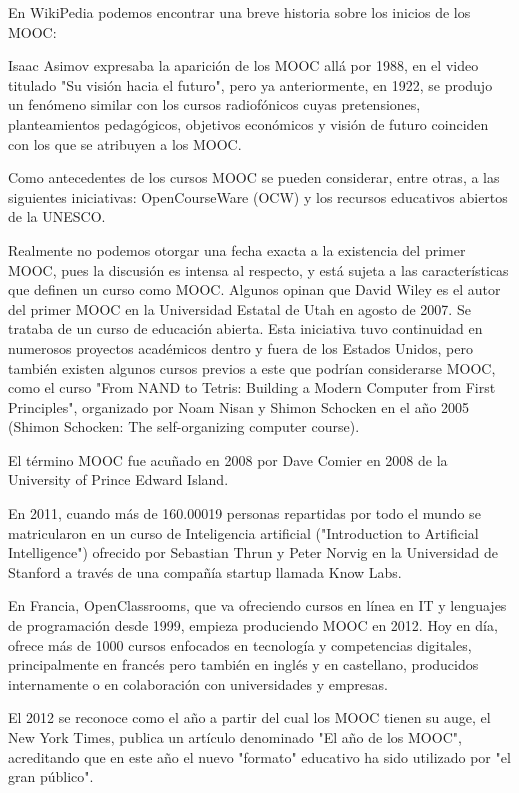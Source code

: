 En WikiPedia podemos encontrar una breve historia sobre los inicios de los MOOC\cite{mooc}:

\bigskip
Isaac Asimov expresaba la aparición de los MOOC allá por 1988, en el video titulado "Su visión hacia el futuro", pero ya anteriormente, en 1922, se produjo un fenómeno similar con los cursos radiofónicos cuyas pretensiones, planteamientos pedagógicos, objetivos económicos y visión de futuro coinciden con los que se atribuyen a los MOOC.


\bigskip
Como antecedentes de los cursos MOOC se pueden considerar, entre otras, a las siguientes iniciativas: OpenCourseWare (OCW) y los recursos educativos abiertos de la UNESCO.

\bigskip
Realmente no podemos otorgar una fecha exacta a la existencia del primer MOOC, pues la discusión es intensa al respecto, y está sujeta a las características que definen un curso como MOOC. Algunos opinan que David Wiley es el autor del primer MOOC en la Universidad Estatal de Utah en agosto de 2007. Se trataba de un curso de educación abierta. Esta iniciativa tuvo continuidad en numerosos proyectos académicos dentro y fuera de los Estados Unidos, pero también existen algunos cursos previos a este que podrían considerarse MOOC, como el curso "From NAND to Tetris: Building a Modern Computer from First Principles", organizado por Noam Nisan y Shimon Schocken en el año 2005 (Shimon Schocken: The self-organizing computer course).

\bigskip
El término MOOC fue acuñado en 2008 por Dave Comier en 2008 de la University of Prince Edward Island.

\bigskip
En 2011, cuando más de 160.00019 personas repartidas por todo el mundo se matricularon en un curso de Inteligencia artificial ("Introduction to Artificial Intelligence") ofrecido por Sebastian Thrun y Peter Norvig en la Universidad de Stanford a través de una compañía startup llamada Know Labs.

\bigskip
En Francia, OpenClassrooms, que va ofreciendo cursos en línea en IT y lenguajes de programación desde 1999, empieza produciendo MOOC en 2012. Hoy en día, ofrece más de 1000 cursos enfocados en tecnología y competencias digitales, principalmente en francés pero también en inglés y en castellano, producidos internamente o en colaboración con universidades y empresas.

\bigskip
El 2012 se reconoce como el año a partir del cual los MOOC tienen su auge, el New York Times, publica un artículo denominado "El año de los MOOC", acreditando que en este año el nuevo "formato" educativo ha sido utilizado por "el gran público".

